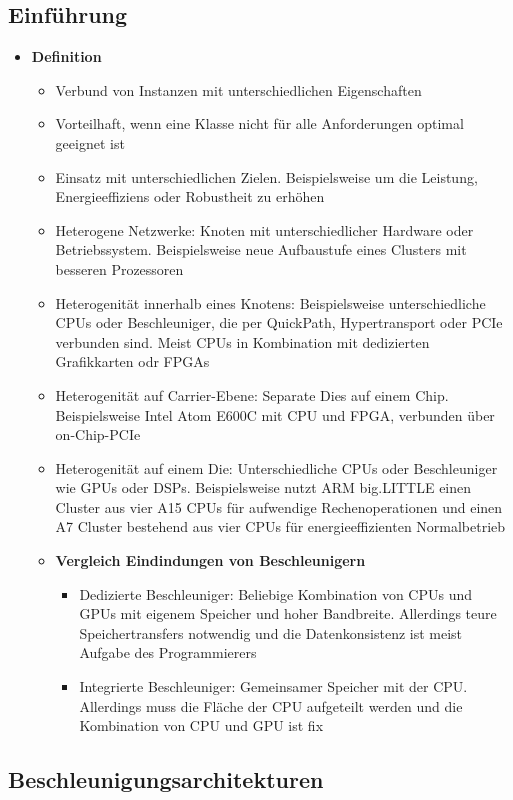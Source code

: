 \subsection{Einführung}
\begin{itemize}
	\item \textbf{Definition}
	\begin{itemize}
		\item Verbund von Instanzen mit unterschiedlichen Eigenschaften
		\item Vorteilhaft, wenn eine Klasse nicht für alle Anforderungen optimal geeignet ist
		\item Einsatz mit unterschiedlichen Zielen. Beispielsweise um die Leistung, Energieeffiziens oder Robustheit zu erhöhen
		\item Heterogene Netzwerke: Knoten mit unterschiedlicher Hardware oder Betriebssystem. Beispielsweise neue Aufbaustufe eines Clusters mit besseren Prozessoren
		\item Heterogenität innerhalb eines Knotens: Beispielsweise unterschiedliche CPUs oder Beschleuniger, die per QuickPath, Hypertransport oder PCIe verbunden sind. Meist CPUs in Kombination mit dedizierten Grafikkarten odr FPGAs
		\item Heterogenität auf Carrier-Ebene: Separate Dies auf einem Chip. Beispielsweise Intel Atom E600C mit CPU und FPGA, verbunden über on-Chip-PCIe
		\item Heterogenität auf einem Die: Unterschiedliche CPUs oder Beschleuniger wie GPUs oder DSPs. Beispielsweise nutzt ARM big.LITTLE einen Cluster aus vier A15 CPUs für aufwendige Rechenoperationen und einen A7 Cluster bestehend aus vier CPUs für energieeffizienten Normalbetrieb
		\item \textbf{Vergleich Eindindungen von Beschleunigern}
		\begin{itemize}
			\item Dedizierte Beschleuniger: Beliebige Kombination von CPUs und GPUs mit eigenem Speicher und hoher Bandbreite. Allerdings teure Speichertransfers notwendig und die Datenkonsistenz ist meist Aufgabe des Programmierers
			\item Integrierte Beschleuniger: Gemeinsamer Speicher mit der CPU. Allerdings muss die Fläche der CPU aufgeteilt werden und die Kombination von CPU und GPU ist fix
		\end{itemize}
	\end{itemize}
\end{itemize}


\subsection{Beschleunigungsarchitekturen}

